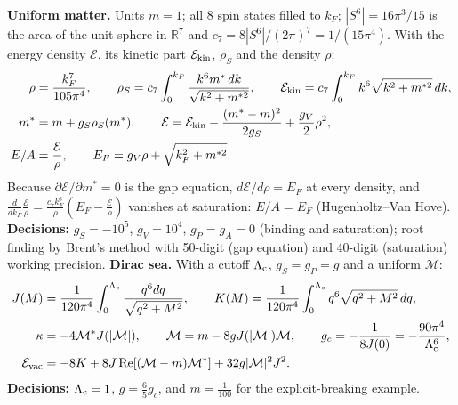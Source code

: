 \documentclass[10pt,a4paper]{article}
\begin{document}
\textbf{Uniform matter.} Units $m=1$; all 8 spin states filled to $k_F$; $|S^6|=16\pi^3/15$ is the area of the unit sphere in $\mathbb R^7$ and $c_7=8|S^6|/(2\pi)^7=1/(15\pi^4)$. With the energy density $\mathcal E$, its kinetic part $\mathcal E_{\rm kin}$, $\rho_S$ and the density $\rho$:
\begin{align*}
\rho&=\frac{k_F^7}{105\pi^4},\qquad \rho_S=c_7\int_0^{k_F}\frac{k^6m^*\,dk}{\sqrt{k^2+m^{*2}}},\qquad \mathcal E_{\rm kin}=c_7\int_0^{k_F}k^6\sqrt{k^2+m^{*2}}\,dk, \\
m^*&=m+g_S\rho_S(m^*),\qquad \mathcal E=\mathcal E_{\rm kin}-\frac{(m^*-m)^2}{2g_S}+\frac{g_V}2\rho^2, \\
E/A&=\frac{\mathcal E}{\rho},\qquad E_F=g_V\rho+\sqrt{k_F^2+m^{*2}} .
\end{align*}
Because $\partial\mathcal E/\partial m^*=0$ is the gap equation, $d\mathcal E/d\rho=E_F$ at every density, and $\frac{d}{dk_F}\frac{\mathcal E}\rho=\frac{c_7k_F^6}{\rho}(E_F-\frac{\mathcal E}{\rho})$ vanishes at saturation: $E/A=E_F$ (Hugenholtz–Van Hove). \textbf{Decisions:} $g_S=-10^5$, $g_V=10^4$, $g_P=g_A=0$ (binding and saturation); root finding by Brent’s method with 50-digit (gap equation) and 40-digit (saturation) working precision. \textbf{Dirac sea.} With a cutoff $\Lambda_{\rm c}$, $g_S=g_P=g$ and a uniform $\mathcal M$:
\begin{align*}
J(M)&=\frac1{120\pi^4}\int_0^{\Lambda_{\rm c}}\frac{q^6dq}{\sqrt{q^2+M^2}},\qquad K(M)=\frac1{120\pi^4}\int_0^{\Lambda_{\rm c}}q^6\sqrt{q^2+M^2}\,dq, \\
\kappa&=-4\mathcal M^*J(|\mathcal M|),\qquad \mathcal M=m-8gJ(|\mathcal M|)\mathcal M,\qquad g_c=-\frac1{8J(0)}=-\frac{90\pi^4}{\Lambda_{\rm c}^6}, \\
\mathcal E_{\rm vac}&=-8K+8J\,\mathrm{Re}[(\mathcal M-m)\mathcal M^*]+32g|\mathcal M|^2J^2 .
\end{align*}
\textbf{Decisions:} $\Lambda_{\rm c}=1$, $g=\frac65g_c$, and $m=\frac1{100}$ for the explicit-breaking example.
\end{document}
